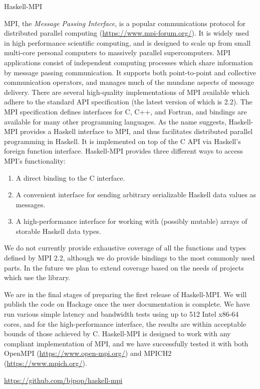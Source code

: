 \begin{hcarentry}[new]{Haskell-MPI}
\label{haskell-mpi}
\makeheader

MPI, the \emph{Message Passing Interface}, is a popular communications protocol
for distributed parallel computing (\url{https://www.mpi-forum.org/}). It is widely
used in high performance scientific computing, and is designed to scale up from
small multi-core personal computers to massively parallel supercomputers.
MPI applications
consist of independent computing processes which share information by message passing
communication. It supports both point-to-point and collective communication operators,
and manages much of the mundane aspects of message delivery. There are several
high-quality implementations of MPI available which adhere to the standard API
specification (the latest version of which is 2.2). The MPI specification defines
interfaces for C, C++, and Fortran, and bindings are available for many other
programming languages. As the name suggests, Haskell-MPI provides a Haskell interface
to MPI, and thus facilitates distributed parallel programming in Haskell. It is implemented
on top of the C API via Haskell's foreign function interface. Haskell-MPI provides
three different ways to access MPI's functionality:
\begin{enumerate}
   \item A direct binding to the C interface.
   \item A convenient interface for sending arbitrary serializable Haskell data values as messages.
   \item A high-performance interface for working with (possibly mutable) arrays of storable
         Haskell data types.
\end{enumerate}
We do not currently provide exhaustive coverage of all the functions and types defined by MPI
2.2, although we do provide bindings to the most commonly used parts. In the future we plan
to extend coverage based on the needs of projects which use the library.

We are in the final stages of preparing the first release of Haskell-MPI. We will
publish the code on Hackage once the user documentation is complete.
We have run various simple latency and bandwidth tests using up to 512 Intel x86-64 cores, and
for the high-performance interface, the results are within acceptable bounds of those
achieved by C.
Haskell-MPI is designed to work with any compliant implementation of MPI, and we
have successfully tested it with both OpenMPI (\url{https://www.open-mpi.org/}) and
MPICH2 (\url{https://www.mpich.org/}).

\FurtherReading
  \url{https://github.com/bjpop/haskell-mpi}
\end{hcarentry}
